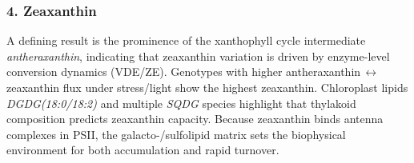\documentclass[10pt,letterpaper]{article}
\begin{document}
\subsubsection*{4. Zeaxanthin}
A defining result is the prominence of the xanthophyll cycle intermediate \textit{antheraxanthin}, indicating that zeaxanthin variation is driven by enzyme-level conversion dynamics (VDE/ZE). Genotypes with higher antheraxanthin{\,$\leftrightarrow$\,}zeaxanthin flux under stress/light show the highest zeaxanthin.
Chloroplast lipids \textit{DGDG(18{:}0/18{:}2)} and multiple \textit{SQDG} species highlight that thylakoid composition predicts zeaxanthin capacity. Because zeaxanthin binds antenna complexes in PSII, the galacto-/sulfolipid matrix sets the biophysical environment for both accumulation and rapid turnover.

\end{document}

